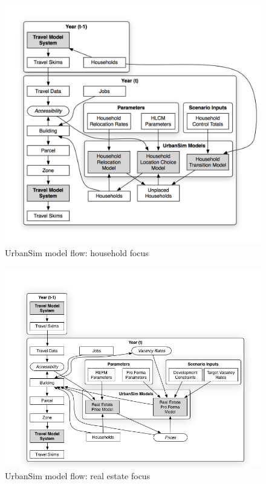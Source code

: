 \begin{figure}[ht]
    \center
    \includegraphics[width=\textwidth]{graphics/ParcelHouseholdModel.png}
    \caption{UrbanSim model flow: household focus}
    \label{fig:household-models}
\end{figure}

\begin{figure}[ht]
    \center
    \includegraphics[width=\textwidth]{graphics/ParcelRealEstateModel.png}
    \caption{UrbanSim model flow: real estate focus}
    \label{fig:parcel-models}
\end{figure}

